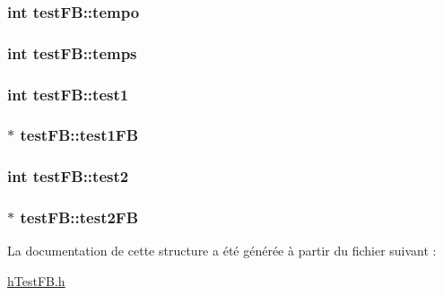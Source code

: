 \subsubsection[{\texorpdfstring{tempo}{tempo}}]{\setlength{\rightskip}{0pt plus 5cm}int test\+F\+B\+::tempo}\hypertarget{structtest_f_b_ac9594af7975494d3f8c232458f72ee38}{}\label{structtest_f_b_ac9594af7975494d3f8c232458f72ee38}
\subsubsection[{\texorpdfstring{temps}{temps}}]{\setlength{\rightskip}{0pt plus 5cm}int test\+F\+B\+::temps}\hypertarget{structtest_f_b_a083d19395309503e328224aa35646a8e}{}\label{structtest_f_b_a083d19395309503e328224aa35646a8e}
\subsubsection[{\texorpdfstring{test1}{test1}}]{\setlength{\rightskip}{0pt plus 5cm}int test\+F\+B\+::test1}\hypertarget{structtest_f_b_afa42eb35c54a2f27711057c5ef41237a}{}\label{structtest_f_b_afa42eb35c54a2f27711057c5ef41237a}
\subsubsection[{\texorpdfstring{test1\+FB}{test1FB}}]{$\ast$ test\+F\+B\+::test1\+FB}\hypertarget{structtest_f_b_aa30ded6b44a96238652680412a3c2f75}{}\label{structtest_f_b_aa30ded6b44a96238652680412a3c2f75}
\subsubsection[{\texorpdfstring{test2}{test2}}]{\setlength{\rightskip}{0pt plus 5cm}int test\+F\+B\+::test2}\hypertarget{structtest_f_b_a8f0856b06ab5e0822da706e8ed6f6e6e}{}\label{structtest_f_b_a8f0856b06ab5e0822da706e8ed6f6e6e}
\subsubsection[{\texorpdfstring{test2\+FB}{test2FB}}]{$\ast$ test\+F\+B\+::test2\+FB}\hypertarget{structtest_f_b_a42c97c44463c946d8112f72736bb2fc5}{}\label{structtest_f_b_a42c97c44463c946d8112f72736bb2fc5}


La documentation de cette structure a été générée à partir du fichier suivant \+:\begin{DoxyCompactItemize}
\item 
\hyperlink{h_test_f_b_8h}{h\+Test\+F\+B.\+h}\end{DoxyCompactItemize}
